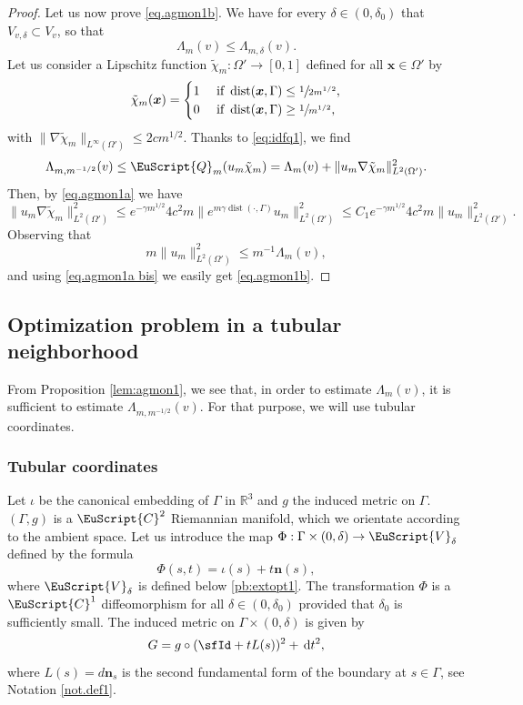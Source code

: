 \documentclass[10pt]{amsart}
\let\mathcal \EuScript
\newcommand{\cC}{\mathcal{C}}
\newcommand{\cQ}{\mathcal{Q}}
\newcommand{\cV}{\mathcal{V}}
\DeclareMathOperator{\dist}{dist}
\theoremstyle{plain}
\theoremstyle{definition}
\newcommand{\RR}{\mathbb{R}}
\newcommand{\dx}{\mathrm{\,d}}
\newcommand{\bn}{{\boldsymbol n}}
\newcommand{\bx}{{\boldsymbol x}}
\begin{document}
\begin{proof}
Let us now prove \eqref{eq.agmon1b}. We have for every $\delta\in(0,\delta_0)$ that $V_{v,\delta}\subset V_v$, so that
\[
\Lambda_{m}(v)\leq\Lambda_{m,\delta}(v).
\]
Let us consider a Lipschitz function $\tilde \chi_m : \Omega' \to [0,1]$ defined for all $\bx\in \Omega'$ by
\[
\tilde \chi_m(\bx) =
\begin{cases}
1 & \mbox{ if }\dist(\bx,\Gamma)\leq \sfrac{1}{2m^{1/2}},\\
0 & \mbox{ if }\dist(\bx,\Gamma)\geq \sfrac{1}{m^{1/2}},
\end{cases}
\]
with $\|\nabla \tilde\chi_{m}\|_{L^\infty(\Omega')}\leq 2 cm^{1/2}$. Thanks to \eqref{eq:idfq1}, we find
\begin{equation}\label{eq.agmon1a bis}
\Lambda_{m,m^{-1/2}}(v)\leq \cQ_m(u_m\tilde \chi_m) = \Lambda_m(v) + \|u_m\nabla \tilde \chi_m\|^2_{L^2(\Omega')}.
\end{equation}
Then, by \eqref{eq.agmon1a} we have
\[ \|u_m\nabla \tilde \chi_m\|^2_{L^2(\Omega')}\leq e^{-\gamma m^{1/2}}4 c^2m\|e^{m\gamma\dist(\cdot, \Gamma)}u_m\|^2_{L^2(\Omega')}\leq
C_1e^{-\gamma m^{1/2}}4 c^2m \|u_m\|^2_{L^2(\Omega')}.\]
Observing that
\[m\|u_{m}\|^2_{L^2(\Omega')}\leq m^{-1}\Lambda_{m}(v),\]
and using \eqref{eq.agmon1a bis} we easily get \eqref{eq.agmon1b}.
\end{proof}

\subsection{Optimization problem in a tubular neighborhood}\label{sec.tub}
From Proposition \ref{lem:agmon1}, we see that, in order to estimate $\Lambda_{m}(v)$, it is sufficient to estimate $\Lambda_{m,m^{-1/2}}(v)$. For that purpose, we will use tubular coordinates.

\subsubsection{Tubular coordinates}
Let $\iota$ be the canonical embedding of $\Gamma$ in $\RR^3$ and $g$ the induced metric on $\Gamma$. $(\Gamma,g)$ is a $\cC^{2}$ Riemannian manifold, which we orientate according to the ambient space. Let us introduce the map $\Phi:\Gamma\times(0,\delta)\to\cV_{\delta}$ defined by the formula
\begin{equation*}
\Phi(s,t)=\iota(s)+t\bn(s),
\end{equation*}
where $\cV_\delta$ is defined below \eqref{pb:extopt1}.
The transformation $\Phi$ is a $\cC^{1}$ diffeomorphism for all $\delta\in(0,\delta_0)$ provided that $\delta_0$ is sufficiently small. The induced metric on $\Gamma\times(0,\delta)$ is given by
\[G=g\circ (\sfId+tL(s))^{2}+\dx t^2,\]
where $L(s)=d\bn_{s}$ is the second fundamental form of the boundary at $s\in\Gamma$, see Notation \ref{not.def1}.
\end{document}
